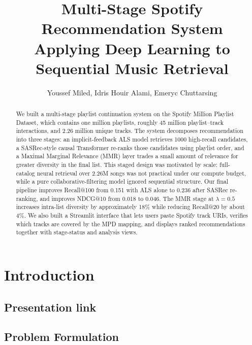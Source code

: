 \documentclass[11pt,a4paper]{article}
\title{%
  \textbf{Multi-Stage Spotify Recommendation System}\\[0.3em]
  \Large{Applying Deep Learning to Sequential Music Retrieval}
}
\author{Youssef Miled, Idris Houir Alami, Emeryc Chuttarsing}
\date{}
\begin{document}
\maketitle


\begin{abstract}
We built a multi-stage playlist continuation system on the Spotify Million
Playlist Dataset, which contains one million playlists, roughly 45 million
playlist--track interactions, and 2.26 million unique tracks. The system
decomposes recommendation into three stages: an implicit-feedback ALS model
retrieves 1000 high-recall candidates, a SASRec-style causal Transformer
re-ranks those candidates using playlist order, and a Maximal Marginal
Relevance (MMR) layer trades a small amount of relevance for greater diversity
in the final list. This staged design was motivated by scale: full-catalog
neural retrieval over 2.26M songs was not practical under our compute budget,
while a pure collaborative-filtering model ignored sequential structure. Our
final pipeline improves Recall@100 from 0.151 with ALS alone to 0.236 after
SASRec re-ranking, and improves NDCG@10 from 0.018 to 0.046. The MMR stage at
$\lambda=0.5$ increases intra-list diversity by approximately 18\% while
reducing Recall@20 by about 4\%. We also built a Streamlit interface that lets
users paste Spotify track URIs, verifies which tracks are covered by the MPD
mapping, and displays ranked recommendations together with stage-status and
analysis views.
\end{abstract}


\section{Introduction}

\subsection{Presentation link}

\subsection{Problem Formulation}
\end{document}
